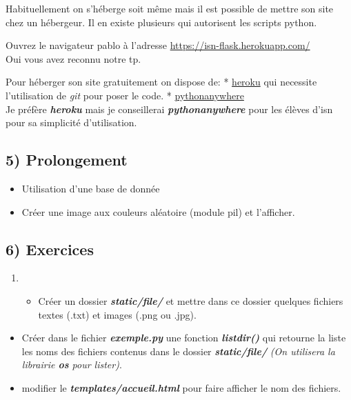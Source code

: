 \documentclass{article}
\begin{document}
Habituellement on s'héberge soit même mais il est possible de mettre son
site chez un hébergeur. Il en existe plusieurs qui autorisent les
scripts python.

Ouvrez le navigateur pablo à l'adresse
\url{https://isn-flask.herokuapp.com/}\\Oui vous avez reconnu notre tp.

Pour héberger son site gratuitement on dispose de: *
\href{https://www.heroku.com/}{heroku} qui necessite l'utilisation de
\emph{git} pour poser le code. *
\href{https://www.pythonanywhere.com}{pythonanywhere}\\Je préfère
\textbf{\emph{heroku}} mais je conseillerai
\textbf{\emph{pythonanywhere}} pour les élèves d'isn pour sa simplicité
d'utilisation.

    \subsection{5) Prolongement}\label{prolongement}

\begin{itemize}
\itemsep1pt\parskip0pt
\item
  Utilisation d'une base de donnée
\item
  Créer une image aux couleurs aléatoire (module pil) et l'afficher.
\end{itemize}

    \subsection{6) Exercices}\label{exercices}

\begin{enumerate}
\def\labelenumi{\arabic{enumi}.}
\item
  \begin{itemize}
  \itemsep1pt\parskip0pt
  \item
    Créer un dossier \textbf{\emph{static/file/}} et mettre dans ce
    dossier quelques fichiers textes (.txt) et images (.png ou .jpg).\\
  \end{itemize}
\end{enumerate}

\begin{itemize}
\itemsep1pt\parskip0pt
\item
  Créer dans le fichier \textbf{\emph{exemple.py}} une fonction
  \textbf{\emph{listdir()}} qui retourne la liste les noms des fichiers
  contenus dans le dossier \textbf{\emph{static/file/}} \emph{(On
  utilisera la librairie \textbf{os} pour lister)}.
\item
  modifier le \textbf{\emph{templates/accueil.html}} pour faire afficher
  le nom des fichiers.
\end{itemize}
\end{document}
